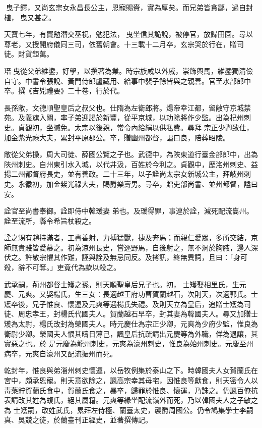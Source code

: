 \begin{pinyinscope}
 曳子鍔，又尚玄宗女永昌長公主，恩寵賜賚，實為厚矣。而兄弟皆貪鄙，過自封植，曳又甚之。



 天寶七年，有竇勉潛交巫祝，勉犯法，曳坐信其詭說，被停官，放歸田園。尋以尊老，又授開府儀同三司，依舊朝會。十三載十二月卒，玄宗哭於行在，贈司
 徒。財貨鉅萬。



 瑨曳從父弟維鍌，好學，以撰著為業。時宗族咸以外戚，崇飾輿馬，維鍌獨清儉自守。中書令張說、黃門侍郎盧藏用、給事中裴子餘皆與之親善。官至水部郎中卒。撰《吉兇禮要》二十卷，行於代。



 長孫敞，文德順聖皇后之叔父也。仕隋為左衛郎將。煬帝幸江都，留敞守京城禁苑。及義旗入關，率子弟迎謁於新豐，從平京城，以功除將作少監。出為杞州刺史。貞觀初，坐贓免。太宗以後親，常令內給絹以供私費。尋拜
 宗正少卿致仕，加金紫光祿大夫，累封平原郡公。卒，贈幽州都督，謚曰良，陪葬昭陵。



 敞從父弟操，周大司徒、薛國公覽之子也。武德中，為陜東道行臺金部郎中，出為陜州刺史。自州東引水入城，以代井汲，百姓於今利之。貞觀中，歷洺州刺史、益揚二州都督府長史，並有善政。二十三年，以子詮尚太宗女新城公主，拜岐州刺史。永徽初，加金紫光祿大夫，賜爵樂壽男。尋卒，贈吏部尚書、並州都督，謚曰安。



 詮官至尚書奉御。詮即侍中韓瑗妻
 弟也。及瑗得罪，事連於詮，減死配流巂州。詮至流所，縣令希旨杖殺之。



 詮之甥有趙持滿者，工書善射，力搏猛獸，捷及奔馬；而親仁愛眾，多所交結，京師無貴賤皆愛慕之。初為涼州長史，嘗逐野馬，自後射之，無不洞於胸腋，邊人深伏之。許敬宗懼其作難，誣與詮及無忌同反。及拷訊，終無異詞，且曰：「身可殺，辭不可奪。」吏竟代為款以殺之。



 武承嗣，荊州都督士矱之孫，則天順聖皇后兄子也。初，
 士矱娶相里氏，生元慶、元爽。又娶楊氏，生三女：長適越王府功曹賀蘭越石，次則天，次適郭氏。士矱卒後，兄子惟良、懷運及元爽等遇楊氏失禮。及則天立為皇后，追贈士矱為司徒、周忠孝王，封楊氏代國夫人。賀蘭越石早卒，封其妻為韓國夫人。尋又加贈士矱為太尉，楊氏改封為榮國夫人。時元慶仕為宗正少卿，元爽為少府少監，惟良為衛尉少卿。榮國夫人恨其疇日薄己，諷皇后抗疏請出元慶等為外職，佯為退讓，其實惡之也。於
 是元慶為龍州刺史，元爽為濠州刺史，惟良為始州刺史。元慶至州病卒，元爽自濠州又配流振州而死。



 乾封年，惟良與弟淄州刺史懷運，以岳牧例集於泰山之下。時韓國夫人女賀蘭氏在宮中，頗承恩寵。則天意欲除之，諷高宗幸其母宅，因惟良等獻食，則天密令人以毒藥貯賀蘭氏食中，賀蘭氏食之，暴卒，歸罪於惟良、懷運，乃誅之。仍諷百僚抗表請改其姓為蝮氏，絕其屬籍。元爽等緣坐配流嶺外而死，乃以韓國夫人之子敏之為
 士矱嗣，改姓武氏，累拜左侍極、蘭臺太史，襲爵周國公。仍令鳩集學士李嗣真、吳兢之徒，於蘭臺刊正經史，並著撰傳記。




\end{pinyinscope}
